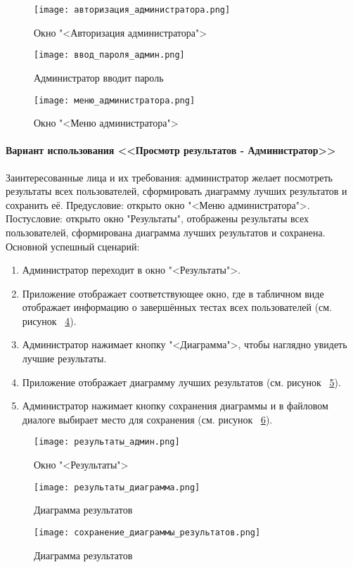 \begin{figure}[ht]
	\centering
	\texttt{[image: авторизация\_администратора.png]}
	\caption{Окно "<Авторизация администратора">}
	\label{admin_auth_window:image}
\end{figure}
\begin{figure}[H]
	\centering
	\texttt{[image: ввод\_пароля\_админ.png]}
	\caption{Администратор вводит пароль}
	\label{admin_password:image}
\end{figure}
\begin{figure}[H]
	\centering
	\texttt{[image: меню\_администратора.png]}
	\caption{Окно "<Меню администратора">}
	\label{admin_menu_1:image}
\end{figure}

\paragraph{Вариант использования <<Просмотр результатов - Администратор>>}

Заинтересованные лица и их требования: администратор желает посмотреть результаты всех пользователей, сформировать диаграмму лучших результатов и сохранить её.
\newline Предусловие: открыто окно "<Меню администратора">.
\newline Постусловие: открыто окно "Результаты", отображены результаты всех пользователей, сформирована диаграмма лучших результатов и сохранена.
\newline Основной успешный сценарий:
\begin{enumerate}
	\item Администратор переходит в окно "<Результаты">.
	\item Приложение отображает соответствующее окно, где в табличном виде отображает информацию о завершённых тестах всех пользователей (см. рисунок ~\ref{admin_results:image}).
	\item Администратор нажимает кнопку "<Диаграмма">, чтобы наглядно увидеть лучшие результаты.
	\item Приложение отображает диаграмму лучших результатов (см. рисунок ~\ref{results_chart:image}).
	\item Администратор нажимает кнопку сохранения диаграммы и в файловом диалоге выбирает место для сохранения (см. рисунок ~\ref{saving_chart:image}).
\end{enumerate}

\begin{figure}[H]
	\centering
	\texttt{[image: результаты\_админ.png]}
	\caption{Окно "<Результаты">}
	\label{admin_results:image}
\end{figure}
\begin{figure}[H]
	\centering
	\texttt{[image: результаты\_диаграмма.png]}
	\caption{Диаграмма результатов}
	\label{results_chart:image}
\end{figure}
\begin{figure}[H]
	\centering
	\texttt{[image: сохранение\_диаграммы\_результатов.png]}
	\caption{Диаграмма результатов}
	\label{saving_chart:image}
\end{figure}

